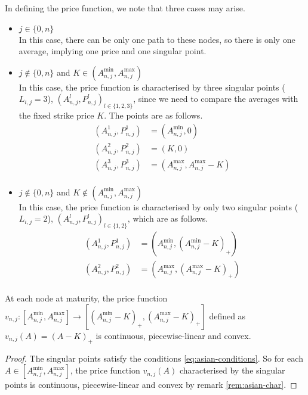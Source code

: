 In defining the price function, we note that three cases may arise.
\begin{itemize}
\item $ j \in \{ 0, n \} $ \\
	In this case, there can be only one path to these nodes, so there is only one average, implying one price and one singular point.
	
\item $ j \notin \{ 0, n \} $ and $ K \in ( A_{n,j}^{\min}, A_{n,j}^{\max} ) $ \\	
	In this case, the price function is characterised by three singular points ($ L_{i,j} = 3 $), $ ( A_{n,j}^l , P_{n,j}^l )_{l \in \{ 1, 2, 3 \} } $, since we need to compare the averages with the fixed strike price $ K $. The points are as follows.  \\
	\begin{equation} \label{eq:asian-price-maturity-kin}
		\begin{aligned}
			( A_{n,j}^1 , P_{n,j}^1 ) &= ( A_{n,j}^{\min} , 0 ) \\
			( A_{n,j}^2 , P_{n,j}^2 ) &= ( K , 0 ) \\
			( A_{n,j}^3 , P_{n,j}^3 ) &= ( A_{n,j}^{\max} , A_{n,j}^{\max} - K ) \\
		\end{aligned}
	\end{equation} \label{eq:asian-price-maturity-kout}
	
\item $ j \notin \{ 0, n \} $ and $ K \notin ( A_{n,j}^{\min}, A_{n,j}^{\max} ) $ \\
	In this case, the price function is characterised by only two singular points ($ L_{i,j} = 2 $), $ ( A_{n,j}^l , P_{n,j}^l )_{l \in \{ 1, 2 \} } $, which are as follows. \\
	\begin{equation}
		\begin{aligned}
			( A_{n,j}^1 , P_{n,j}^1 ) &= ( A_{n,j}^{\min} , ( A_{n,j}^{\min} - K )_+ ) \\
			( A_{n,j}^2 , P_{n,j}^2 ) &= ( A_{n,j}^{\max} , ( A_{n,j}^{\max} - K )_+ ) \\
		\end{aligned}
	\end{equation}
\end{itemize}

\begin{lmm}
	\label{lmm:asian-pr-maturity}
	At each node at maturity, the price function $ { v_{n,j}: \left[ A_{n,j}^{\min}, A_{n,j}^{\max} \right] \to \left[ ( A_{n,j}^{\min} - K )_+ , ( A_{n,j}^{\max} - K )_+ \right] } $ defined as $ v_{n,j}(A) = (A - K)_+ $ is continuous, piecewise-linear and convex.
\end{lmm}
\begin{proof}
	The singular points satisfy the conditions \ref{eq:asian-conditions}. So for each $ A \in \left[ A_{n,j}^{\min}, A_{n,j}^{\max} \right] $, the price function ${ v_{n,j}(A) }$ characterised by the singular points is continuous, piecewise-linear and convex by remark \ref{rem:asian-char}.
\end{proof}




